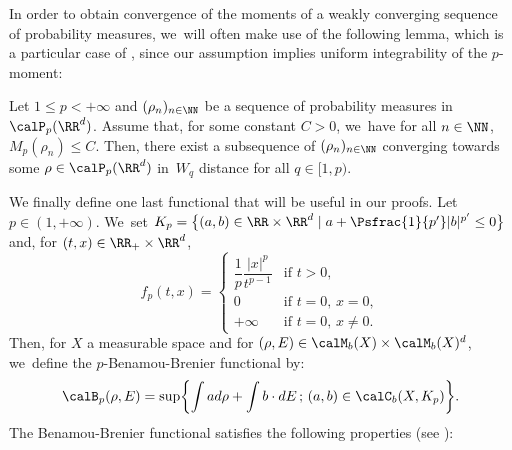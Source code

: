 In order to obtain convergence of the moments of a weakly converging sequence of probability measures, we~will often make use of the following lemma, which is a particular case of \cite[Prop.\,7.1.5]{ambrosio08}, since our assumption implies uniform integrability of the $p$-moment:
\begin{lemma}\label{lemma:boundedWpImpliesCompactWq}
Let $1 \leq p < +\infty$ and $(\rho_n)_{n \in \NN}$ be a sequence of probability measures in $\calP_p(\RR^d)$.
Assume that, for some constant $C>0$, we~have for all $n \in \NN$, $M_p(\rho_n) \leq C$.
Then, there exist a subsequence of $(\rho_n)_{n \in \NN}$ converging towards some $\rho \in \calP_p(\RR^d)$ in~$W_q$ distance for all $q \in [1,p)$.
\end{lemma}

We finally define one last functional that will be useful in our proofs. Let $p \in (1, +\infty)$. We~set $K_p = \bigl\lbrace (a,b) \in \RR \times \RR^d \mid a + \Psfrac{1}{p'} |b|^{p'} \leq 0 \bigr\rbrace$ and, for $(t,x) \in \RR_+ \times \RR^d$,
\[
f_p(t,x) = \begin{cases}
\dfrac{1}{p} \dfrac{|x|^p}{t^{p-1}} & \text{if } t>0, \\
0 & \text{if } t=0, \, x=0, \\
+\infty & \text{if } t=0, \, x \neq 0.
\end{cases}
\]
Then, for $X$ a measurable space and for $(\rho, E) \in \calM_b(X) \times \calM_b(X)^d$, we~define the $p$-Benamou-Brenier functional by:
\[
\calB_p(\rho, E) = \sup \biggl\lbrace \int a d\rho + \int b \cdot dE \,; \, (a,b) \in \calC_b(X, K_p) \biggr\rbrace.
\]
The Benamou-Brenier functional satisfies the following properties (see \cite[Prop.\,5.18]{otam15}):

